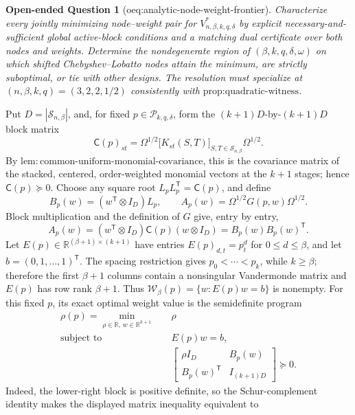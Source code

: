 \documentclass{article}
\newtheorem{openendedquestion}{Open-ended Question}
\begin{document}
\begin{openendedquestion}[oeq:analytic-node-weight-frontier]\label{oeq:analytic-node-weight-frontier}
Characterize every jointly minimizing node--weight pair for \(V^*_{n,\beta,k,q,\delta}\) by explicit necessary-and-sufficient global active-block conditions and a matching dual certificate over both nodes and weights. Determine the nondegenerate region of \((\beta,k,q,\delta,\omega)\) on which shifted Chebyshev--Lobatto nodes attain the minimum, are strictly suboptimal, or tie with other designs. The resolution must specialize at \((n,\beta,k,q)=(3,2,2,1/2)\) consistently with \(\text{prop:quadratic-witness}\).
\end{openendedquestion}
Put \(D=|\mathcal S_{n,\beta}|\), and, for fixed \(p\in\mathcal P_{k,q,\delta}\), form the \((k+1)D\)-by-\((k+1)D\) block matrix
\[
 \mathsf C(p)_{st}
 =\Omega^{1/2}\bigl[K_{st}(S,T)\bigr]_{S,T\in\mathcal S_{n,\beta}}\Omega^{1/2}.
\]
By \(\mathrm{lem{:}common\text{-}uniform\text{-}monomial\text{-}covariance}\), this is the covariance matrix of the stacked, centered, order-weighted monomial vectors at the \(k+1\) stages; hence \(\mathsf C(p)\succeq0\).  Choose any square root \(L_pL_p^{\mathsf T}=\mathsf C(p)\), and define
\[
 B_p(w)=(w^{\mathsf T}\otimes I_D)L_p,
 \qquad
 A_p(w)=\Omega^{1/2}G(p,w)\Omega^{1/2}.
\]
Block multiplication and the definition of \(G\) give, entry by entry,
\[
 A_p(w)
 =(w^{\mathsf T}\otimes I_D)\mathsf C(p)(w\otimes I_D)
 =B_p(w)B_p(w)^{\mathsf T}.
\]
Let \(E(p)\in\mathbb R^{(\beta+1)\times(k+1)}\) have entries \(E(p)_{d,t}=p_t^d\) for \(0\le d\le\beta\), and let \(b=(0,1,\ldots,1)^{\mathsf T}\).  The spacing restriction gives \(p_0<\cdots<p_k\), while \(k\ge\beta\); therefore the first \(\beta+1\) columns contain a nonsingular Vandermonde matrix and \(E(p)\) has row rank \(\beta+1\).  Thus \(\mathcal W_\beta(p)=\{w:E(p)w=b\}\) is nonempty.  For this fixed \(p\), its exact optimal weight value is the semidefinite program
\[
 \begin{aligned}
 \rho(p)=\min_{\rho\in\mathbb R,\,w\in\mathbb R^{k+1}}\quad&\rho\\
 \text{subject to}\quad&E(p)w=b,\\
 &\begin{bmatrix}
 \rho I_D&B_p(w)\\
 B_p(w)^{\mathsf T}&I_{(k+1)D}
 \end{bmatrix}\succeq0.
 \end{aligned}
\]
Indeed, the lower-right block is positive definite, so the Schur-complement identity makes the displayed matrix inequality equivalent to
\end{document}
